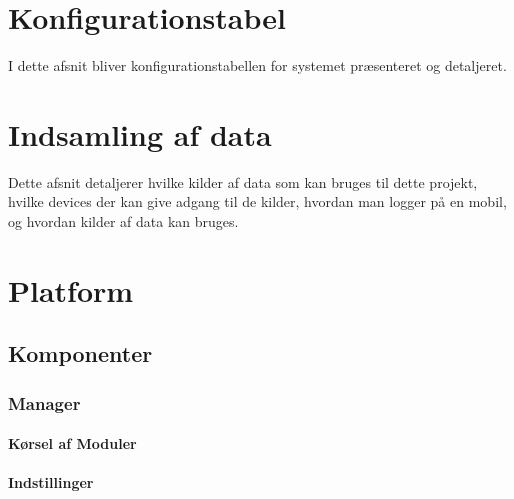 












\chapter{Konfigurationstabel} 
I dette afsnit bliver konfigurationstabellen for systemet præsenteret og detaljeret.






\chapter{Indsamling af data}
Dette afsnit detaljerer hvilke kilder af data som kan bruges til dette projekt, hvilke devices der kan give adgang til de kilder, hvordan man logger på en mobil, og hvordan kilder af data kan bruges.






\chapter{Platform}




\section{Komponenter}

\subsection{Manager}

\subsubsection{Kørsel af Moduler}

\subsubsection{Indstillinger}

